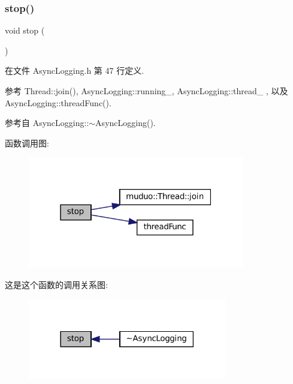 \subsubsection{\texorpdfstring{stop()}{stop()}}
{\footnotesize\ttfamily void stop (\begin{DoxyParamCaption}{ }\end{DoxyParamCaption})\hspace{0.3cm}{\ttfamily [inline]}}



在文件 Async\+Logging.\+h 第 47 行定义.



参考 Thread\+::join(), Async\+Logging\+::running\+\_\+, Async\+Logging\+::thread\+\_\+ , 以及 Async\+Logging\+::thread\+Func().



参考自 Async\+Logging\+::$\sim$\+Async\+Logging().

函数调用图\+:
\nopagebreak
\begin{figure}[H]
\begin{center}
\leavevmode
\includegraphics[width=268pt]{classmuduo_1_1AsyncLogging_a849302529291497f64017bf57efb5606_cgraph}
\end{center}
\end{figure}
这是这个函数的调用关系图\+:
\nopagebreak
\begin{figure}[H]
\begin{center}
\leavevmode
\includegraphics[width=246pt]{classmuduo_1_1AsyncLogging_a849302529291497f64017bf57efb5606_icgraph}
\end{center}
\end{figure}
\mbox{\label{classmuduo_1_1AsyncLogging_a539feb3c59a20db3b260b312fa7dea34}} 
